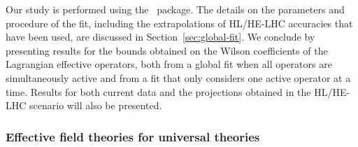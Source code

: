 Our study is performed using the \HEPfit\, package. The 
%
details on the parameters and procedure of the fit, including
the extrapolations of HL/HE-LHC accuracies that have been used, are discussed
in Section~\ref{sec:global-fit}.  We
conclude by presenting results for the bounds obtained on the Wilson
coefficients of the Lagrangian effective operators, both from a global
fit when all operators are simultaneously active and from a fit that
only considers one active operator at a time. Results for both current
data and the projections obtained in the HL/HE-LHC scenario will also
be presented. 
%


\subsubsection{Effective field theories for universal theories}
\label{sec:general-framework}

